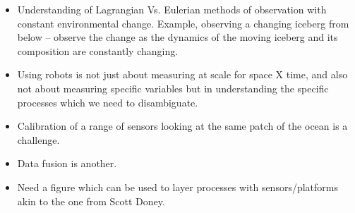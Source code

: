 \begin{itemize}[noitemsep,topsep=0pt,parsep=0pt,partopsep=0pt]
\item Understanding of Lagrangian Vs. Eulerian methods of
  observation with constant environmental change. Example, observing a
  changing iceberg from below -- observe the change as the dynamics of
  the moving iceberg and its composition are constantly changing.

\item Using robots is not just about measuring at scale for space X
  time, and also not about measuring specific variables but in
  understanding the specific processes which we need to disambiguate.

\item Calibration of a range of sensors looking at the same patch of the
  ocean is a challenge.

\item Data fusion is another.

\item Need a figure which can be used to layer processes with
  sensors/platforms akin to the one from Scott Doney.

\end{itemize}